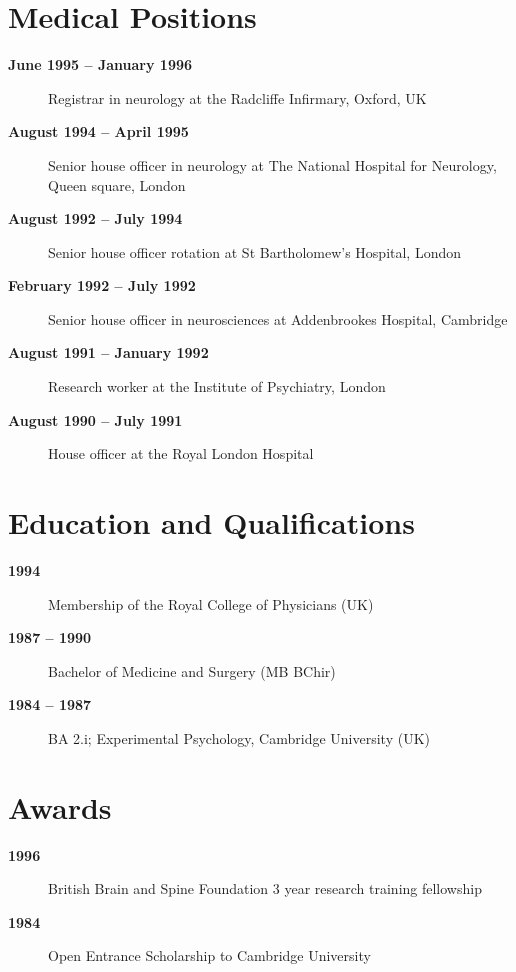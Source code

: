 \documentclass[letterpaper,11pt,openany]{sphinxhowto}
\begin{document}
\section{Medical Positions}
\label{research/cv_wrapper:medical-positions}\begin{description}
\item[{\textbf{June 1995 – January 1996}}] \leavevmode
Registrar in neurology at the Radcliffe Infirmary, Oxford, UK

\item[{\textbf{August 1994 – April 1995}}] \leavevmode
Senior house officer in neurology at The National Hospital for Neurology, Queen square, London

\item[{\textbf{August 1992 – July 1994}}] \leavevmode
Senior house officer rotation at St Bartholomew’s Hospital, London

\item[{\textbf{February 1992 – July 1992}}] \leavevmode
Senior house officer in neurosciences at Addenbrookes Hospital, Cambridge

\item[{\textbf{August 1991 – January 1992}}] \leavevmode
Research worker at the Institute of Psychiatry, London

\item[{\textbf{August 1990 – July 1991}}] \leavevmode
House officer at the Royal London Hospital

\end{description}


\section{Education and Qualifications}
\label{research/cv_wrapper:education-and-qualifications}\begin{description}
\item[{\textbf{1994}}] \leavevmode
Membership of the Royal College of Physicians (UK)

\item[{\textbf{1987 – 1990}}] \leavevmode
Bachelor of Medicine and Surgery (MB BChir)

\item[{\textbf{1984 – 1987}}] \leavevmode
BA 2.i; Experimental Psychology, Cambridge University (UK)

\end{description}


\section{Awards}
\label{research/cv_wrapper:awards}\begin{description}
\item[{\textbf{1996}}] \leavevmode
British Brain and Spine Foundation 3 year research training fellowship

\item[{\textbf{1984}}] \leavevmode
Open Entrance Scholarship to Cambridge University

\end{description}
\end{document}

